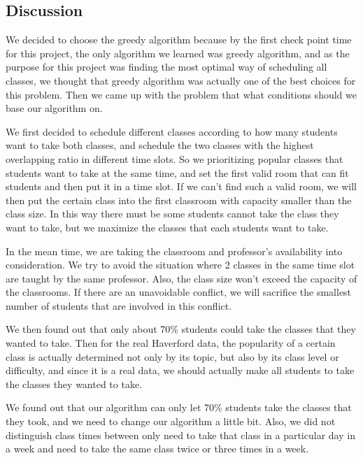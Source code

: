 \documentclass[11pt, oneside]{article}   	%
\begin{document}


\subsection{Discussion}
We decided to choose the greedy algorithm because by the first check point time for this project, the only algorithm we learned was greedy algorithm, and as the purpose for this project was finding the most optimal way of scheduling all classes, we thought that greedy algorithm was actually one of the best choices for this problem. Then we came up with the problem that what conditions should we base our algorithm on.

We first decided to schedule different classes according to how many students want to take both classes, and schedule the two classes with the highest overlapping ratio in different time slots. So we prioritizing popular classes that students want to take at the same time, and set the first valid room that can fit students and then put it in a time slot. If we can't find such a valid room, we will then put the certain class into the first classroom with capacity smaller than the class size. In this way there must be some students cannot take the class they want to take, but we maximize the classes that each students want to take.

In the mean time, we are taking the classroom and professor's availability into consideration. We try to avoid the situation where 2 classes in the same time slot are taught by the same professor. Also, the class size won't exceed the capacity of the classrooms. If there are an unavoidable conflict, we will sacrifice the smallest number of students that are involved in this conflict.

We then found out that only about 70\% students could take the classes that they wanted to take. Then for the real Haverford data, the popularity of a certain class is actually determined not only by its topic, but also by its class level or difficulty, and since it is a real data, we should actually make all students to take the classes they wanted to take. 

We found out that our algorithm can only let 70\% students take the classes that they took, and we need to change our algorithm a little bit. Also, we did not distinguish class times between only need to take that class in a particular day in a week and need to take the same class twice or three times in a week. 
\end{document}
